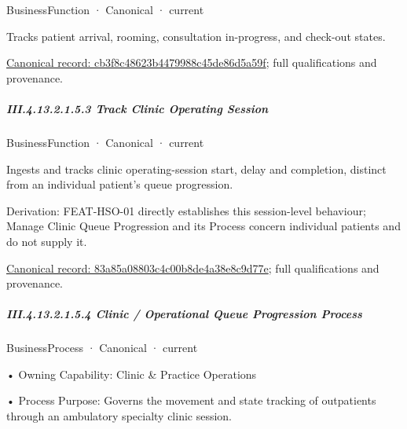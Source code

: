 \label{element:cb3f8c48623b4479988c45de86d5a59f}
{\small BusinessFunction · Canonical · current}\par

Tracks patient arrival, rooming, consultation in-progress, and check-out states.


{\footnotesize \href{../../../../../../../../continuum/business/business-function/cb3f8c48623b4479988c45de86d5a59f.md}{Canonical record: cb3f8c48623b4479988c45de86d5a59f}; full qualifications and provenance.}\par
\subparagraph*{III.4.13.2.1.5.3 Track Clinic Operating Session}
\label{navigation:III.4.13.2.1.5.3}

\label{element:83a85a08803c4c00b8de4a38e8c9d77e}
{\small BusinessFunction · Canonical · current}\par

Ingests and tracks clinic operating-session start, delay and completion, distinct from an individual patient's queue progression.



Derivation: FEAT-HSO-01 directly establishes this session-level behaviour; Manage Clinic Queue Progression and its Process concern individual patients and do not supply it.


{\footnotesize \href{../../../../../../../../continuum/business/business-function/83a85a08803c4c00b8de4a38e8c9d77e.md}{Canonical record: 83a85a08803c4c00b8de4a38e8c9d77e}; full qualifications and provenance.}\par
\subparagraph*{III.4.13.2.1.5.4 Clinic / Operational Queue Progression Process}
\label{navigation:III.4.13.2.1.5.4}

\label{element:319d6956276a4cdeb43e350e1b01d078}
{\small BusinessProcess · Canonical · current}\par

•
Owning Capability: Clinic \& Practice Operations



•
Process Purpose: Governs the movement and state tracking of outpatients through an ambulatory specialty clinic session.



